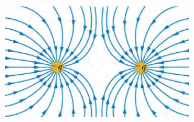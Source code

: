 \documentclass{beamer}
\begin{document}
\begin{frame}
\begin{columns}
        \begin{alertblock}{  2}
            \begin{figure}
                \centering
                \includegraphics[width=1\linewidth]{lkfldlns.png}
            \end{figure}
        \end{alertblock}
    \end{columns}
\end{frame}
\end{document}
